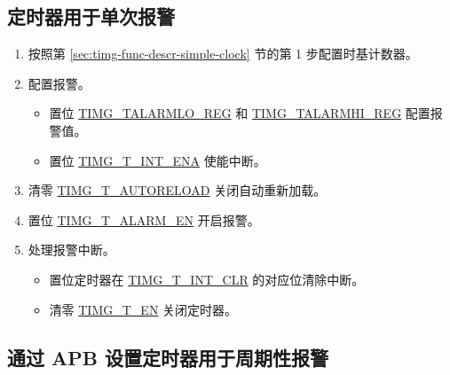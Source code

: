 \documentclass[main\_\_CN.tex]{subfiles}
\begin{document}
\subsection{定时器用于单次报警}\label{sec:timg-func-descr-timer-alarm}
\begin{enumerate}
    \item 按照第 \ref{sec:timg-func-descr-simple-clock} 节的第 1 步配置时基计数器。
    \item 配置报警。
    \begin{itemize}
        \item 置位 \hyperref[regdesc:TIMGTXALARMLOREG]{TIMG\_TALARMLO\_REG} 和 \hyperref[regdesc:TIMGTXALARMHIREG]{TIMG\_TALARMHI\_REG} 配置报警值。
        \item 置位 \hyperref[fielddesc:TIMGTXINTENA]{TIMG\_T\_INT\_ENA} 使能中断。
    \end{itemize}
    \item 清零 \hyperref[fielddesc:TIMGTXAUTORELOAD]{TIMG\_T\_AUTORELOAD} 关闭自动重新加载。
    \item 置位 \hyperref[fielddesc:TIMGTXALARMEN]{TIMG\_T\_ALARM\_EN} 开启报警。
    \item 处理报警中断。
    \begin{itemize}
        \item 置位定时器在 \hyperref[fielddesc:TIMGTXINTCLR]{TIMG\_T\_INT\_CLR} 的对应位清除中断。
        \item 清零 \hyperref[fielddesc:TIMGTXEN]{TIMG\_T\_EN} 关闭定时器。
    \end{itemize}
\end{enumerate}

\subsection{通过 APB 设置定时器用于周期性报警}
\end{document}
